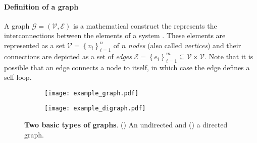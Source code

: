 \paragraph*{Definition of a graph}
A graph $\mathcal{G} = \left(\mathcal{V}, \mathcal{E}\right)$ is a mathematical construct the represents the interconnections between the elements of a system \cite{West2001Introductiongraphtheory}. These elements are represented as a set $ \mathcal{V}=\left\lbrace v_i\right\rbrace^n_{i=1}$ of $n$ \emph{nodes} (also called \emph{vertices}) and their connections are depicted as a set of \emph{edges} $ \mathcal{E}= \left\lbrace e_i\right\rbrace^m_{i=1} \subseteq \mathcal{V} \times \mathcal{V} $. Note that it is possible that an edge connects a node to itself, in which case the edge defines a self loop.
\begin{figure*}[!h]
	\centering	
	\hspace*{\fill}
	\begin{subfigure}[t]{0.32\textwidth}
		\subcaption{}
		\texttt{[image: example\_graph.pdf]}
		\label{fig:example_graph}
	\end{subfigure}	
	\hfill
	\begin{subfigure}[t]{0.32\textwidth}
		\subcaption{}
		\texttt{[image: example\_digraph.pdf]}
		\label{fig:example_digraph}
	\end{subfigure}
	\hspace*{\fill}	
	\caption[] {\label{fig:graph_examples} \textbf{Two basic types of graphs}. () An undirected and () a directed graph.}
\end{figure*}

